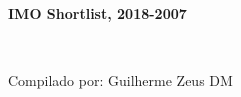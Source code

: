 \begin{center}
    {\fontsize{.8cm}{1cm}\selectfont
    
    \hrulefill\\\vspace{-1.25em}
    \hrulefill\\
    
    \textbf{IMO Shortlist, 2018-2007} \\\vspace{-.75em}
    
    \hrulefill\\\vspace{-1.25em}
	\hrulefill

	\vspace{0.1cm}
	}

	{\hfill Compilado por: Guilherme Zeus DM}

    \vspace{1cm}
    
    \fontsize{.40cm}{.5cm}\selectfont
   
	\newcommand\x{$\times$}

%        


\end{center}
